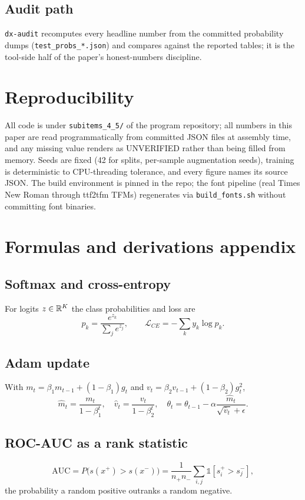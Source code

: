 \subsection{Audit path}
\texttt{dx-audit} recomputes every headline number from the committed
probability dumps (\texttt{test\_probs\_*.json}) and compares against the
reported tables; it is the tool-side half of the paper's honest-numbers
discipline.

\section{Reproducibility}
All code is under \texttt{subitems\_4\_5/} of the program repository; all
numbers in this paper are read programmatically from committed JSON files
at assembly time, and any missing value renders as UNVERIFIED rather than
being filled from memory. Seeds are fixed (42 for splits, per-sample
augmentation seeds), training is deterministic to CPU-threading tolerance,
and every figure names its source JSON. The build environment is pinned in
the repo; the font pipeline (real Times New Roman through ttf2tfm TFMs)
regenerates via \texttt{build\_fonts.sh} without committing font binaries.

\section{Formulas and derivations appendix}
\subsection{Softmax and cross-entropy}
For logits $z \in \mathbb{R}^K$ the class probabilities and loss are
\begin{equation}
p_k = \frac{e^{z_k}}{\sum_{j} e^{z_j}}, \qquad
\mathcal{L}_{CE} = -\sum_{k} y_k \log p_k .
\end{equation}
\subsection{Adam update}
With $m_t = \beta_1 m_{t-1} + (1-\beta_1) g_t$ and
$v_t = \beta_2 v_{t-1} + (1-\beta_2) g_t^2$,
\begin{equation}
\hat m_t = \frac{m_t}{1-\beta_1^t}, \quad
\hat v_t = \frac{v_t}{1-\beta_2^t}, \quad
\theta_t = \theta_{t-1} - \alpha \frac{\hat m_t}{\sqrt{\hat v_t}+\epsilon}.
\end{equation}
\subsection{ROC-AUC as a rank statistic}
\begin{equation}
\mathrm{AUC} = P\big(s(x^+) > s(x^-)\big)
= \frac{1}{n_+ n_-} \sum_{i,j} \mathbb 1[s_i^+ > s_j^-] ,
\end{equation}
the probability a random positive outranks a random negative.
